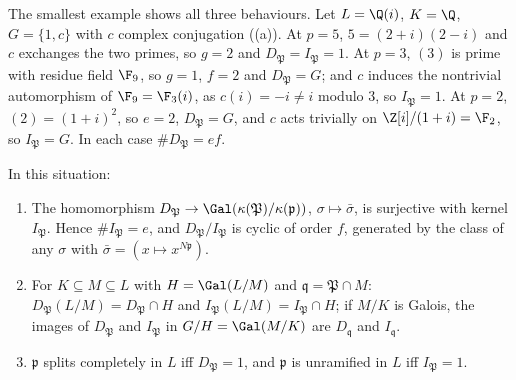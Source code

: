 The smallest example shows all three behaviours. Let $L=\Q(i)$, $K=\Q$, $G=\{1,c\}$ with $c$ complex conjugation ((a)). At $p=5$,
$5=(2+i)(2-i)$ and $c$ exchanges the two primes, so $g=2$ and $D_{\mathfrak P}=I_{\mathfrak P}=1$. At $p=3$, $(3)$ is prime with residue field $\F_9$, so
$g=1$, $f=2$ and $D_{\mathfrak P}=G$; and $c$ induces the nontrivial automorphism of $\F_9=\F_3(i)$, as $c(i)=-i\ne i$ modulo $3$, so $I_{\mathfrak P}=1$. At
$p=2$, $(2)=(1+i)^2$, so $e=2$, $D_{\mathfrak P}=G$, and $c$ acts trivially on $\Z[i]/(1+i)=\F_2$, so $I_{\mathfrak P}=G$. In each case $\#D_{\mathfrak P}=ef$.

\begin{theorem}\label{thm:ant:residuegalois}
In this situation:
\begin{enumerate}[label=(\roman*)]
\item The homomorphism $D_{\mathfrak P}\to\Gal(\kappa(\mathfrak P)/\kappa(\mathfrak p))$, $\sigma\mapsto\bar\sigma$, is surjective with kernel $I_{\mathfrak P}$.
Hence $\#I_{\mathfrak P}=e$, and $D_{\mathfrak P}/I_{\mathfrak P}$ is cyclic of order $f$, generated by the class of any $\sigma$ with
$\bar\sigma=(x\mapsto x^{N\mathfrak p})$.
\item For $K\subseteq M\subseteq L$ with $H=\Gal(L/M)$ and $\mathfrak q=\mathfrak P\cap M$: $D_{\mathfrak P}(L/M)=D_{\mathfrak P}\cap H$ and
$I_{\mathfrak P}(L/M)=I_{\mathfrak P}\cap H$; if $M/K$ is Galois, the images of $D_{\mathfrak P}$ and $I_{\mathfrak P}$ in $G/H=\Gal(M/K)$ are $D_{\mathfrak q}$ and
$I_{\mathfrak q}$.
\item $\mathfrak p$ splits completely in $L$ iff $D_{\mathfrak P}=1$, and $\mathfrak p$ is unramified in $L$ iff $I_{\mathfrak P}=1$.
\end{enumerate}
\end{theorem}

